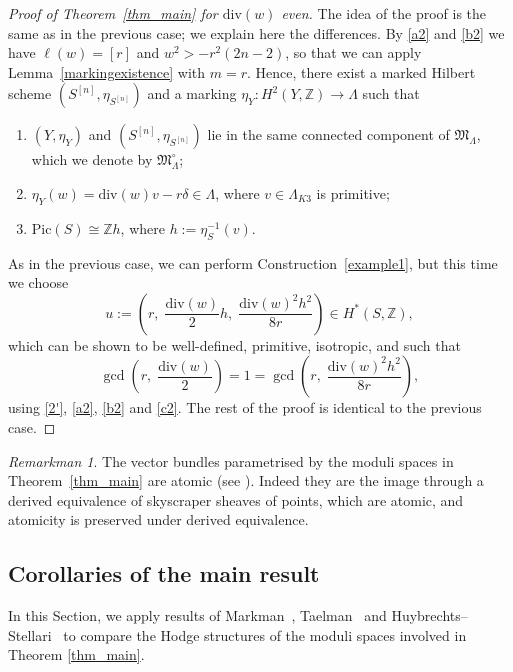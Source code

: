 \documentclass[12pt,a4paper]{amsart}
\theoremstyle{plain}
\theoremstyle{definition}
\theoremstyle{remark}
\newtheorem{rmkn}[thm]{Remarkman}
\def\Pic{\mathrm{Pic}}
\def\Z{\mathbb{Z}}
\def\H{H}
\newcommand{\ZZ}{\mathbb{Z}}
\newcommand{\dv}{\mathrm{div}}
\newcommand{\Lambdan}{{\Lambda}}
\begin{document}
\begin{proof}[Proof of Theorem~\ref{thm_main} for $\dv(w)$ even]
The idea of the proof is the same as in the previous case; we explain here the differences. By \ref{a2} and \ref{b2} we have $\ell(w) = [r]$ and $w^2 > -r^2(2n-2)$, so that we can apply Lemma~\ref{markingexistence} with $m = r$. Hence, there exist a marked Hilbert scheme $(S^{[n]},\eta_{S^{[n]}})$ and a marking $\eta_Y \colon \H^2(Y,\mathbb{Z}) \to \Lambdan$ such that
\begin{enumerate}[label=(\arabic*')]
    \item $(Y,\eta_Y)$ and $(S^{[n]},\eta_{S^{[n]}})$ lie in the same connected component of $\mathfrak{M}_\Lambdan$, which we denote by $\mathfrak{M}^\circ_\Lambdan$;
    \item \label{2'} $\eta_Y(w) = \dv(w)v - r\delta \in \Lambdan$, where $v \in \Lambda_{K3}$ is primitive;
    \item $\Pic(S) \cong \Z h$, where $h := \eta_S^{-1}(v)$.
\end{enumerate}
As in the previous case, we can perform Construction~\ref{example1}, but this time we choose
\begin{equation}\label{Mukai_even}
    u := \left(r,\;\frac{\dv(w)}{2}h,\;\frac{\dv(w)^2 h^2}{8r}\right) \in \H^{\ast}(S,\ZZ),
\end{equation}
which can be shown to be well-defined, primitive, isotropic, and such that
\[
\gcd\left(r,\; \frac{\dv(w)}{2}\right) = 1= \gcd\left(r,\; \frac{\dv(w)^2 h^2}{8r}\right),
\]
using \ref{2'}, \ref{a2}, \ref{b2} and \ref{c2}. The rest of the proof is identical to the previous case.
\end{proof}

\begin{rmkn}
    The vector bundles parametrised by the moduli spaces in Theorem~\ref{thm_main} are atomic (see \cite{beckmann}). Indeed they are the image through a derived equivalence of skyscraper sheaves of  points, which are atomic, and atomicity is preserved under derived equivalence.
\end{rmkn}


\subsection{Corollaries of the main result}
In this Section, we apply results of Markman~\cite{markman}, Taelman~\cite{tae23} and Huybrechts--Stellari~\cite{paolo_huy} to compare the Hodge structures of the moduli spaces involved in Theorem \ref{thm_main}.
\end{document}
